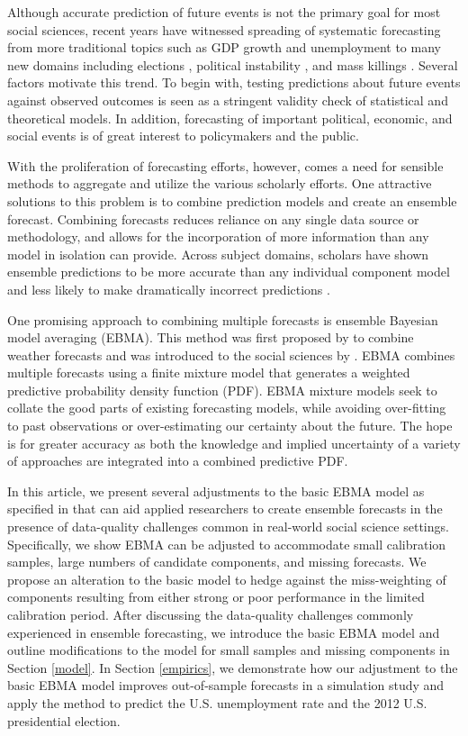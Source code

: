 \documentclass[12pt,fullpage,endnotes]{article}
\begin{document}
Although accurate prediction of future events is not the primary goal
for most social sciences, recent years have witnessed spreading of
systematic forecasting from more traditional topics such as GDP growth
and unemployment to many new domains including elections
\citep[e.g.,][]{Linzer:2013}, political instability
\citep[e.g.,][]{Goldstone:etal:2010}, and mass killings
\citep{Ulfelder:2012}.  Several factors motivate this trend.  To begin
with, testing predictions about future events against observed
outcomes is seen as a stringent validity check of statistical and
theoretical models.  In addition, forecasting of important political,
economic, and social events is of great interest to policymakers and
the public.


With the proliferation of forecasting efforts, however, comes a need
for sensible methods to aggregate and utilize the various scholarly
efforts.  One attractive solutions to this problem is to combine
prediction models and create an ensemble forecast.  Combining
forecasts reduces reliance on any single data source or methodology,
and allows for the incorporation of more information than any model in
isolation can provide.  Across subject domains, scholars have shown
ensemble predictions to be more accurate than any individual component
model and less likely to make dramatically incorrect predictions
\citep{Bates:1969,Armstrong:2001,Raftery:2005}.

One promising approach to combining multiple forecasts is ensemble
Bayesian model averaging (EBMA). This method was first proposed by
\citet{Raftery:2005} to combine weather forecasts and was introduced
to the social sciences by \citet{mhw:2012}. EBMA combines multiple
forecasts using a finite mixture model that generates a weighted
predictive probability density function (PDF).  EBMA mixture models
seek to collate the good parts of existing forecasting models, while
avoiding over-fitting to past observations or over-estimating our
certainty about the future.  The hope is for greater accuracy as both
the knowledge and implied uncertainty of a variety of approaches are
integrated into a combined predictive PDF.

In this article, we present several adjustments to the basic EBMA
model as specified in \citet{mhw:2012} that can aid applied
researchers to create ensemble forecasts in the presence of
data-quality challenges common in real-world social science settings.
Specifically, we show EBMA can be adjusted to accommodate small
calibration samples, large numbers of candidate components, and
missing forecasts.  We propose an alteration to the basic model to
hedge against the miss-weighting of components resulting from either
strong or poor performance in the limited calibration period.  After
discussing the data-quality challenges commonly experienced in
ensemble forecasting, we introduce the basic EBMA model and outline
modifications to the model for small samples and missing components in
Section \ref{model}. In Section \ref{empirics}, we demonstrate how our
adjustment to the basic EBMA model improves out-of-sample forecasts in
a simulation study and apply the method to predict the
U.S. unemployment rate and the 2012 U.S. presidential election.
\end{document}
